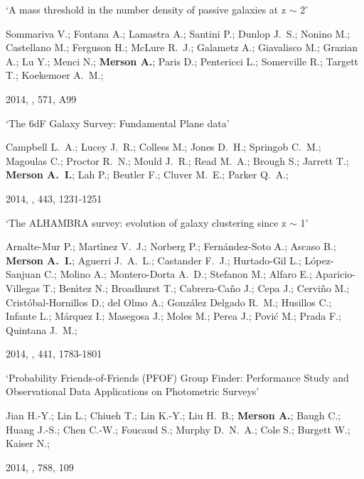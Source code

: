 \begin{etaremune}[leftmargin=15pt]
\item \label{itm:Sommariva2014} `A mass threshold in the number density of passive galaxies at z $\sim$ 2'\newline
  \begin{small}Sommariva V.; Fontana A.; Lamastra A.; Santini P.; Dunlop J.~S.; Nonino M.; Castellano M.; Ferguson H.; McLure R.~J.; Galametz A.; Giavalisco M.; Grazian A.; Lu Y.; Menci N.; \textbf{Merson A.}; Paris D.; Pentericci L.; Somerville R.; Targett T.; Koekemoer A.~M.;\end{small} 2014, \aap, 571, A99

\item \label{itm:Campbell2014} `The 6dF Galaxy Survey: Fundamental Plane data'\newline
  \begin{small}Campbell L.~A.; Lucey J.~R.; Colless M.; Jones D.~H.; Springob C.~M.; Magoulas C.; Proctor R.~N.; Mould J.~R.; Read M.~A.; Brough S.; Jarrett T.; \textbf{Merson A.~I.}; Lah P.; Beutler F.; Cluver M.~E.; Parker Q.~A.;\end{small} 2014, \mnras, 443, 1231-1251

\item \label{itm:Arnalte-Mur2014} `The ALHAMBRA survey: evolution of galaxy clustering since z $\sim$ 1'\newline
  \begin{small}Arnalte-Mur P.; Mart{\'{\i}}nez V.~J.; Norberg P.; Fern{\'a}ndez-Soto A.; Ascaso B.; \textbf{Merson A.~I.}; Aguerri J.~A.~L.; Castander F.~J.; Hurtado-Gil L.; L{\'o}pez-Sanjuan C.; Molino A.; Montero-Dorta A.~D.; Stefanon M.; Alfaro E.; Aparicio-Villegas T.; Ben{\'{\i}}tez N.; Broadhurst T.; Cabrera-Ca{\~n}o J.; Cepa J.; Cervi{\~n}o M.; Crist{\'o}bal-Hornillos D.; del Olmo A.; Gonz{\'a}lez Delgado R.~M.; Husillos C.; Infante L.; M{\'a}rquez I.; Masegosa J.; Moles M.; Perea J.; Povi{\'c} M.; Prada F.; Quintana J.~M.;\end{small} 2014, \mnras, 441, 1783-1801

\item \label{itm:Jian2014} `Probability Friends-of-Friends (PFOF) Group Finder: Performance Study and Observational Data Applications on Photometric Surveys'\newline
  \begin{small}Jian H.-Y.; Lin L.; Chiueh T.; Lin K.-Y.; Liu H.~B.; \textbf{Merson A.}; Baugh C.; Huang J.-S.; Chen C.-W.; Foucaud S.; Murphy D.~N.~A.; Cole S.; Burgett W.; Kaiser N.;\end{small} 2014, \apj, 788, 109


\end{etaremune}
